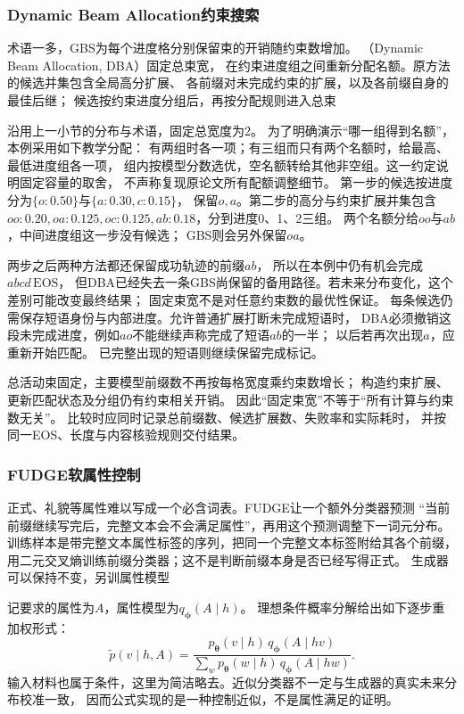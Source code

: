\subsubsection{Dynamic Beam Allocation约束搜索}
\label{sec:nlp-generation-dba}

术语一多，GBS为每个进度格分别保留束的开销随约束数增加。
（Dynamic Beam Allocation, DBA）固定总束宽，
在约束进度组之间重新分配名额。原方法的候选并集包含全局高分扩展、
各前缀对未完成约束的扩展，以及各前缀自身的最佳后继；
候选按约束进度分组后，再按分配规则进入总束

沿用上一小节的分布与术语，固定总宽度为2。
为了明确演示“哪一组得到名额”，本例采用如下教学分配：
有两组时各一项；有三组而只有两个名额时，给最高、最低进度组各一项，
组内按模型分数选优，空名额转给其他非空组。这一约定说明固定容量的取舍，
不声称复现原论文所有配额调整细节。
第一步的候选按进度分为$\{o:0.50\}$与$\{a:0.30,c:0.15\}$，
保留$o,a$。第二步的高分与约束扩展并集包含
$oo:0.20,oa:0.125,oc:0.125,ab:0.18$，分到进度0、1、2三组。
两个名额分给$oo$与$ab$，中间进度组这一步没有候选；
GBS则会另外保留$oa$。

两步之后两种方法都还保留成功轨迹的前缀$ab$，
所以在本例中仍有机会完成$abcd\,\mathrm{EOS}$，
但DBA已经失去一条GBS尚保留的备用路径。若未来分布变化，这个差别可能改变最终结果；
固定束宽不是对任意约束数的最优性保证。
每条候选仍需保存短语身份与内部进度。允许普通扩展打断未完成短语时，
DBA必须撤销这段未完成进度，例如$ao$不能继续声称完成了短语$ab$的一半；
以后若再次出现$a$，应重新开始匹配。
已完整出现的短语则继续保留完成标记。

总活动束固定，主要模型前缀数不再按每格宽度乘约束数增长；
构造约束扩展、更新匹配状态及分组仍有约束相关开销。
因此“固定束宽”不等于“所有计算与约束数无关”。
比较时应同时记录总前缀数、候选扩展数、失败率和实际耗时，
并按同一EOS、长度与内容核验规则交付结果。

\subsubsection{FUDGE软属性控制}
\label{sec:nlp-generation-fudge}

正式、礼貌等属性难以写成一个必含词表。FUDGE让一个额外分类器预测
“当前前缀继续写完后，完整文本会不会满足属性”，再用这个预测调整下一词元分布。
训练样本是带完整文本属性标签的序列，把同一个完整文本标签附给其各个前缀，
用二元交叉熵训练前缀分类器；这不是判断前缀本身是否已经写得正式。
生成器可以保持不变，另训属性模型

记要求的属性为$A$，属性模型为$q_{\bm{\phi}}(A\mid h)$。
理想条件概率分解给出如下逐步重加权形式：
\begin{equation}
  \widetilde p(v\mid h,A)=
  \frac{p_{\bm{\theta}}(v\mid h)\,q_{\bm{\phi}}(A\mid hv)}
  {\sum_w p_{\bm{\theta}}(w\mid h)\,q_{\bm{\phi}}(A\mid hw)}.
  \label{eq:nlp-generation-fudge}
\end{equation}
输入材料也属于条件，这里为简洁略去。近似分类器不一定与生成器的真实未来分布校准一致，
因而公式实现的是一种控制近似，不是属性满足的证明。

